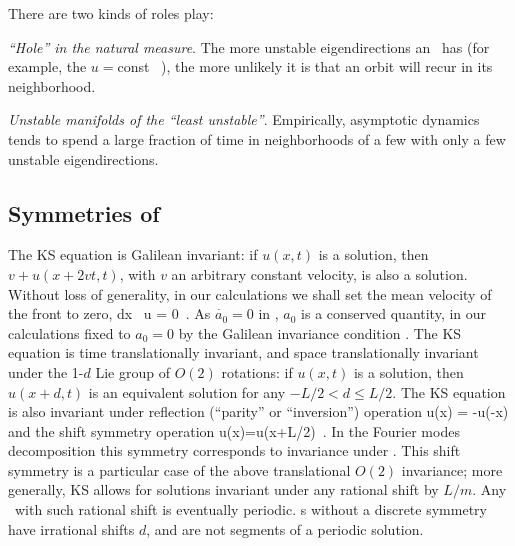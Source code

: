 There are two kinds of roles
{\eqva} play:

{\em ``Hole'' in the natural measure}.
The more unstable eigendirections an \eqv\ has (for example, the
$u=$const \eqv~), the more unlikely it is  that
an orbit will recur in its neighborhood.

{\em Unstable manifolds of the ``least unstable''{\eqva}}.
Empirically, asymptotic dynamics tends to spend
a large fraction of time in
neighborhoods of a few  {\eqva} with
only a few unstable eigendirections.


\subsection{Symmetries of \KSe}

The  KS equation is
Galilean invariant: if $u(x,t)$ is a solution, then 
$v+u(x+2vt,t)$, with $v$ an arbitrary constant velocity, is also a solution. 
Without loss of generality, in our calculations we shall set 
the mean velocity of the  front to zero,
\beq
\int dx \, u = 0
\,.
As  $\dot{a_0}=0$ in , 
$a_0$ is a conserved quantity, in our calculations
fixed to $a_0=0$ by the Galilean invariance condition .
The KS equation   is time translationally invariant,
and 
space translationally invariant
under the 1-$d$ Lie group of $O(2)$ rotations: if
$u(x,t)$ is a solution, then $u(x+d,t)$ is an equivalent
solution for any $-L/2 < d \leq L/2$.
The KS equation is also invariant under
reflection (``parity'' or ``inversion'') operation
\beq
\Refl u(x) = -u(-x)
and the shift symmetry operation 
\beq
\Shift u(x)=u(x+L/2)
\,. 
In the Fourier modes decomposition  this
symmetry corresponds to invariance under
.
This shift symmetry is a particular case of the
above translational $O(2)$ invariance; more generally,
KS allows for solutions invariant under any rational shift by
$L/m$. Any \rpo\ with such rational shift is eventually periodic.
\Rpo s without a discrete symmetry have irrational shifts
$d$, and are not segments of a periodic solution.


